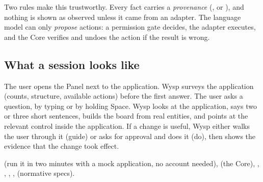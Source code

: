 Two rules make this trustworthy. Every fact carries a \emph{provenance} (\pobs, \pinf{} or \pill), and nothing is shown as observed unless it came from an adapter. The language model can only \emph{propose} actions: a permission gate decides, the adapter executes, and the Core verifies and undoes the action if the result is wrong.

\subsection*{What a session looks like}

The user opens the Panel next to the application. Wysp surveys the application (counts, structure, available actions) before the first answer. The user asks a question, by typing or by holding Space. Wysp looks at the application, says two or three short sentences, builds the board from real entities, and points at the relevant control inside the application. If a change is useful, Wysp either walks the user through it (guide) or asks for approval and does it (do), then shows the evidence that the change took effect.

\begin{wherebox}
 (run it in two minutes with a mock application, no account needed),  (the Core), , , , ,  (normative specs).
\end{wherebox}




